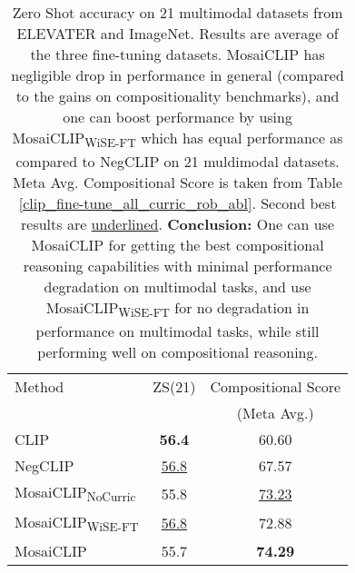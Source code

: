 \documentclass[11pt]{article}
\newcommand{\methodcomp}{MosaiCLIP}
\newcommand{\methodcompNoCurric}{MosaiCLIP\textsubscript{NoCurric}}
\newcommand{\methodcompNoCurricbold}{\textbf{MosaiCLIP\textsubscript{NoCurric}}}
\newcommand{\methodcompwiseft}{MosaiCLIP\textsubscript{WiSE-FT}}
\newcommand{\methodcompwiseftbold}{\textbf{MosaiCLIP\textsubscript{WiSE-FT}}}
\newcommand{\clip}{CLIP}
\newcommand{\negclip}{NegCLIP}
\begin{document}
\begin{table*}[h!]
      \caption{Ablating the effect of Curriculum learning and Robust fine-tuning. \methodcompNoCurricbold{} refers to the version of our model without any curriculum learning. \methodcompwiseftbold{} refers to the version where the image encoder of the final model (after fine-tuning) and before fine-tuning are weight-space ensembled. \clip{} and \negclip{} scores are also shown for reference. See Appendix Sec. \ref{curric_ft_effect}. }
      \label{clip_fine-tune_all_curric_rob_abl}
  \end{table*}

\begin{table}[h!]
  \fontsize{10}{10pt}\selectfont
      \centering
      \setlength{\tabcolsep}{2.5pt}
{
        \begin{tabular}{lcc}
        \toprule
        Method & ZS(21) & Compositional Score\\
        & & (Meta Avg.)\\
        \midrule
        \clip{}   & \textbf{56.4} & 60.60\\
        \negclip{}    & \underline{56.8} & 67.57\\
        \methodcompNoCurric{}     & 55.8 & \underline{73.23}\\
        \methodcompwiseft{}   & \underline{56.8} & 72.88\\
        \methodcomp{}     & 55.7 & \textbf{74.29}\\
        \bottomrule
        \end{tabular}
    }
    \caption{Zero Shot accuracy on 21 multimodal datasets from ELEVATER and ImageNet. Results are average of the three fine-tuning datasets. \methodcomp{} has negligible drop in performance in general (compared to the gains on compositionality benchmarks), and one can boost performance by using \methodcompwiseft{} which has equal performance as compared to \negclip{} on 21 muldimodal datasets. Meta Avg. Compositional Score is taken from Table \ref{clip_fine-tune_all_curric_rob_abl}. Second best results are \underline{underlined}. \textbf{Conclusion:} One can use \methodcomp{} for getting the best compositional reasoning capabilities with minimal performance degradation on multimodal tasks, and use \methodcompwiseft{} for no degradation in performance on multimodal tasks, while still performing well on compositional reasoning.}
    \label{ft_zs_21_table}
\end{table}
\end{document}
